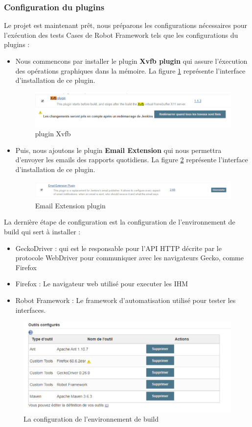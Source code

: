 \subsubsection{Configuration du plugins}
Le projet est maintenant prêt, nous préparons les configurations nécessaires pour l'exécution des tests Cases de Robot Framework tels que les configurations du plugins :
\begin{itemize}
	\item Nous commencons par installer le plugin \textbf{Xvfb plugin} qui assure l'éxecution des opérations graphiques dans la mémoire. La figure \ref{fig:xvfb} représente l'interface d'installation de ce plugin.
	\begin{figure}[H]
		\centering
		\includegraphics[width=0.9\linewidth]{img/jenkins/xvfb}
		\caption[plugin Xvfb]{plugin Xvfb}
		\label{fig:xvfb}
	\end{figure}
	
	\item Puis, nous ajoutons le plugin \textbf{Email Extension} qui nous permettra d'envoyer les emails des rapports quotidiens. La figure \ref{fig:email} représente l'interface d'installation de ce plugin.
	\begin{figure}[H]
		\centering
		\includegraphics[width=0.9\linewidth]{img/jenkins/email}
		\caption[Email Extension plugin]{Email Extension plugin}
		\label{fig:email}
	\end{figure}
	
\end{itemize}
La dernière étape de configuration est la configuration de l'environnement de build qui sert à installer :
\begin{itemize}
	\item GeckoDriver : qui est le responsable pour l'API HTTP décrite par le protocole WebDriver pour communiquer avec les navigateurs Gecko, comme Firefox
	\item Firefox : Le navigateur web utilisé pour executer les IHM
	\item Robot Framework : Le framework d'automatisation utilisé pour tester les interfaces.
\end{itemize}
\begin{figure}[H]
	\centering
	\includegraphics[width=0.7\linewidth]{img/jenkins/env-build}
	\caption[La configuration de l'environnement de build]{La configuration de l'environnement de build}
	\label{fig:env-build}
\end{figure}
